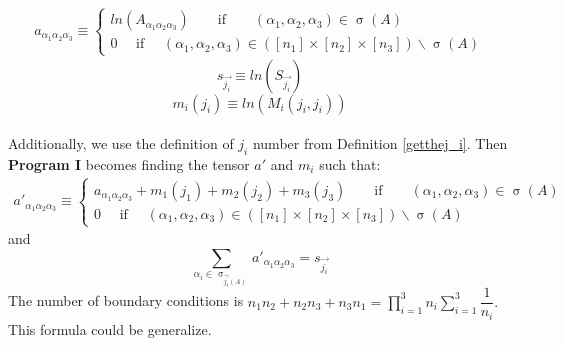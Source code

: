 \documentclass{article}
\begin{document}
\begin{eqnarray*}
a_{\alpha_1\alpha_2\alpha_3} \equiv   \left\{ 
\begin{array}{c}
ln(A_{\alpha_1\alpha_2\alpha_3}) \qquad \text{if} \qquad (\alpha_1,\alpha_2,\alpha_3) \in \upsigma(A)  \\ 
0 \quad \text{  if  } \quad (\alpha_1,\alpha_2,\alpha_3) \in ([n_1]\times[n_2]\times[n_3]) \backslash \upsigma(A)
\end{array}
\right.
\end{eqnarray*}
$$s_{\Vec{j_i}} \equiv ln(S_{\Vec{j_i}} )$$
$$m_i(j_i) \equiv ln(M_i(j_i, j_i)) $$
\\
Additionally, we use the definition of $j_i$ number from Definition \ref{getthej_i}. Then \textbf{Program I} becomes finding the tensor $a'$ and $m_i$ such that:
\begin{eqnarray*}
a'_{\alpha_1\alpha_2\alpha_3} \equiv   \left\{ 
\begin{array}{c}
a_{\alpha_1\alpha_2\alpha_3} + m_1(j_1) + m_2(j_2) + m_3(j_3) \qquad \text{if} \qquad (\alpha_1,\alpha_2,\alpha_3) \in \upsigma(A)  \\ 
0 \quad \text{  if  } \quad (\alpha_1,\alpha_2,\alpha_3) \in ([n_1]\times[n_2]\times[n_3]) \backslash \upsigma(A)
\end{array}
\right.
\end{eqnarray*}
and 
\begin{equation}
\sum_{\alpha_i \in \upsigma_{\Vec{j_i}(A)}} a'_{\alpha_1\alpha_2\alpha_3} = s_{\Vec{j_i}}  
\end{equation}
The number of boundary conditions is $n_1n_2 + n_2n_3 + n_3n_1 =  \prod\limits_{i=1}^{3}n_i\sum\limits_{i=1}^{3}\dfrac{1}{n_i}.$ This formula could be generalize.
\end{document}
